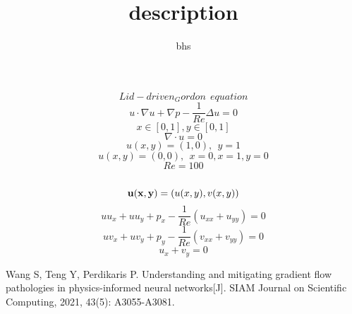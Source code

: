 \documentclass[12pt]{amsart}
\title{description}
\author{bhs}
\begin{document}
\maketitle

$$Lid-driven_Gordon \ \ equation$$
$$u \cdot \nabla u + \nabla p -\frac{1}{Re} \Delta u = 0$$
$$x\in [0,1] ,y \in [0,1]$$
$$\nabla \cdot u = 0$$
$$u(x,y) = (1,0) , \ \ y=1$$
$$u(x,y) = (0,0) , \ \ x=0,x=1,y=0$$
$$Re=100$$\\
$$\bold{u(x,y)}=(u(x,y),v(x,y))$$
$$uu_{x}+uu_{y}+p_x -\frac{1}{Re}(u_{xx}+u_{yy}) = 0$$
$$uv_{x}+uv_{y}+p_y -\frac{1}{Re}(v_{xx}+v_{yy}) = 0$$
$$u_{x}+v_{y}= 0$$


\begin{thebibliography}{10}
Wang S, Teng Y, Perdikaris P. Understanding and mitigating gradient flow pathologies in physics-informed neural networks[J]. SIAM Journal on Scientific Computing, 2021, 43(5): A3055-A3081.
\end{thebibliography}
\end{document}
